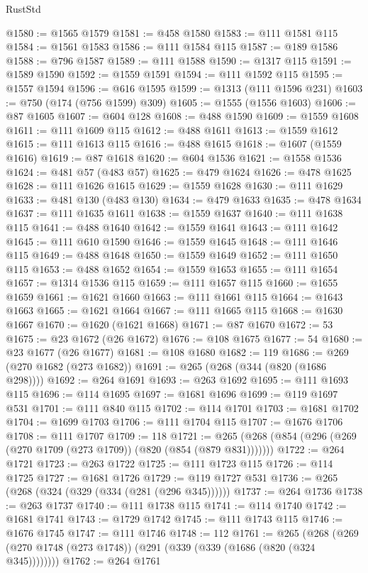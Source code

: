 \begin{lexlean}{RustStd}
\begin{coremodule}
@1580 := @1565 @1579
@1581 := @458 @1580
@1583 := @111 @1581 @115
@1584 := @1561 @1583
@1586 := @111 @1584 @115
@1587 := @189 @1586
@1588 := @796 @1587
@1589 := @111 @1588
@1590 := @1317 @115
@1591 := @1589 @1590
@1592 := @1559 @1591
@1594 := @111 @1592 @115
@1595 := @1557 @1594
@1596 := @616 @1595
@1599 := @1313 (@111 @1596 @231)
@1603 := @750 (@174 (@756 @1599) @309)
@1605 := @1555 (@1556 @1603)
@1606 := @87 @1605
@1607 := @604 @128
@1608 := @488 @1590
@1609 := @1559 @1608
@1611 := @111 @1609 @115
@1612 := @488 @1611
@1613 := @1559 @1612
@1615 := @111 @1613 @115
@1616 := @488 @1615
@1618 := @1607 (@1559 @1616)
@1619 := @87 @1618
@1620 := @604 @1536
@1621 := @1558 @1536
@1624 := @481 @57 (@483 @57)
@1625 := @479 @1624
@1626 := @478 @1625
@1628 := @111 @1626 @1615
@1629 := @1559 @1628
@1630 := @111 @1629
@1633 := @481 @130 (@483 @130)
@1634 := @479 @1633
@1635 := @478 @1634
@1637 := @111 @1635 @1611
@1638 := @1559 @1637
@1640 := @111 @1638 @115
@1641 := @488 @1640
@1642 := @1559 @1641
@1643 := @111 @1642
@1645 := @111 @610 @1590
@1646 := @1559 @1645
@1648 := @111 @1646 @115
@1649 := @488 @1648
@1650 := @1559 @1649
@1652 := @111 @1650 @115
@1653 := @488 @1652
@1654 := @1559 @1653
@1655 := @111 @1654
@1657 := @1314 @1536 @115
@1659 := @111 @1657 @115
@1660 := @1655 @1659
@1661 := @1621 @1660
@1663 := @111 @1661 @115
@1664 := @1643 @1663
@1665 := @1621 @1664
@1667 := @111 @1665 @115
@1668 := @1630 @1667
@1670 := @1620 (@1621 @1668)
@1671 := @87 @1670
@1672 := 53
@1675 := @23 @1672 (@26 @1672)
@1676 := @108 @1675
@1677 := 54
@1680 := @23 @1677 (@26 @1677)
@1681 := @108 @1680
@1682 := 119
@1686 := @269 (@270 @1682 (@273 @1682))
@1691 := @265 (@268 (@344 (@820 (@1686 @298))))
@1692 := @264 @1691
@1693 := @263 @1692
@1695 := @111 @1693 @115
@1696 := @114 @1695
@1697 := @1681 @1696
@1699 := @119 @1697 @531
@1701 := @111 @840 @115
@1702 := @114 @1701
@1703 := @1681 @1702
@1704 := @1699 @1703
@1706 := @111 @1704 @115
@1707 := @1676 @1706
@1708 := @111 @1707
@1709 := 118
@1721 := @265 (@268 (@854 (@296 (@269 (@270 @1709 (@273 @1709)) (@820 (@854 (@879 @831)))))))
@1722 := @264 @1721
@1723 := @263 @1722
@1725 := @111 @1723 @115
@1726 := @114 @1725
@1727 := @1681 @1726
@1729 := @119 @1727 @531
@1736 := @265 (@268 (@324 (@329 (@334 (@281 (@296 @345))))))
@1737 := @264 @1736
@1738 := @263 @1737
@1740 := @111 @1738 @115
@1741 := @114 @1740
@1742 := @1681 @1741
@1743 := @1729 @1742
@1745 := @111 @1743 @115
@1746 := @1676 @1745
@1747 := @111 @1746
@1748 := 112
@1761 := @265
    (@268 (@269 (@270 @1748 (@273 @1748)) (@291 (@339 (@339 (@1686 (@820 (@324 @345))))))))
@1762 := @264 @1761

\end{coremodule}
\end{lexlean}
